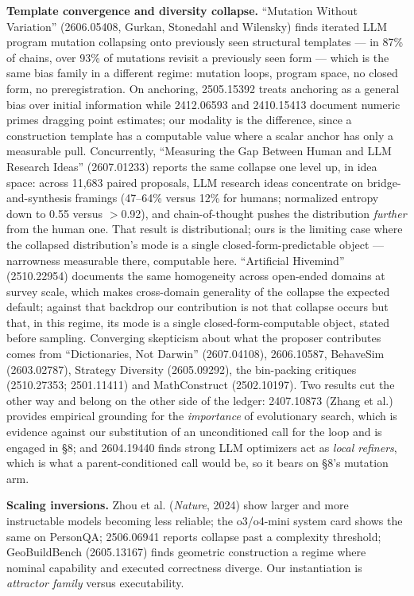 \documentclass[11pt]{article}
\begin{document}
\textbf{Template convergence and diversity collapse.} ``Mutation Without Variation'' (2606.05408,
Gurkan, Stonedahl and Wilensky) finds iterated LLM program mutation collapsing onto previously
seen structural templates --- in 87\% of chains, over 93\% of mutations revisit a previously seen
form --- which is the same bias family in a different regime: mutation loops, program space, no
closed form, no preregistration. On anchoring, 2505.15392 treats anchoring as a general bias
over initial information while 2412.06593 and 2410.15413 document numeric primes dragging point
estimates; our modality is the difference, since a construction template has a computable value
where a scalar anchor has only a measurable pull. Concurrently, ``Measuring the Gap Between
Human and LLM Research Ideas'' (2607.01233) reports the same collapse one level up, in idea
space: across 11{,}683 paired proposals, LLM research ideas concentrate on bridge-and-synthesis
framings (47--64\% versus 12\% for humans; normalized entropy down to 0.55 versus $>$0.92), and
chain-of-thought pushes the distribution \textit{further} from the human one. That result is
distributional; ours is the limiting case where the collapsed distribution's mode is a single
closed-form-predictable object --- narrowness measurable there, computable here. ``Artificial
Hivemind'' (2510.22954) documents the same homogeneity across open-ended domains at survey
scale, which makes cross-domain generality of the collapse the expected default; against that
backdrop our contribution is not that collapse occurs but that, in this regime, its mode is
a single closed-form-computable object, stated before sampling. Converging
skepticism about what the proposer contributes comes from ``Dictionaries, Not Darwin'' (2607.04108), 2606.10587, BehaveSim
(2603.02787), Strategy Diversity (2605.09292), the bin-packing critiques (2510.27353;
2501.11411) and MathConstruct (2502.10197). Two results cut the other way and belong on the
other side of the ledger: 2407.10873 (Zhang et al.) provides empirical grounding for the
\textit{importance} of evolutionary search, which is evidence against our substitution of an
unconditioned call for the loop and is engaged in \S8; and 2604.19440 finds strong LLM optimizers
act as \textit{local refiners}, which is what a parent-conditioned call would be, so it bears on \S8's
mutation arm.

\textbf{Scaling inversions.} Zhou et al. (\textit{Nature}, 2024) show larger and more instructable models
becoming less reliable; the o3/o4-mini system card shows the same on PersonQA; 2506.06941
reports collapse past a complexity threshold; GeoBuildBench (2605.13167) finds geometric
construction a regime where nominal capability and executed correctness diverge. Our
instantiation is \textit{attractor family} versus executability.
\end{document}

